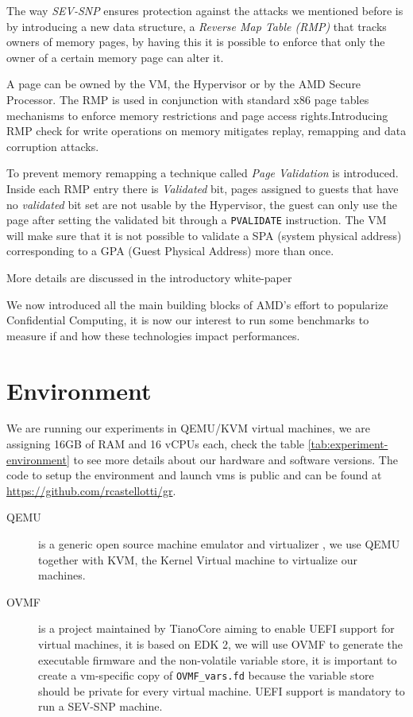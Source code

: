\documentclass[twocolumn]{article}
\begin{document}
The way \textit{SEV-SNP} ensures protection against the attacks we mentioned before is by introducing a new data structure, a \textit{Reverse Map Table (RMP)} that tracks owners of memory pages, by having this it is possible to enforce that only the owner of a certain memory page can alter it.

A page can be owned by the VM, the Hypervisor or by the AMD Secure Processor. The RMP is used in conjunction with standard x86 page tables mechanisms to enforce memory restrictions and page access rights.Introducing RMP check for write operations on memory mitigates replay, remapping and data corruption attacks. 

To prevent memory remapping a technique called \textit{Page Validation} is introduced. Inside each RMP entry there is \textit{Validated} bit, pages assigned to guests that have no \textit{validated} bit set are not usable by the Hypervisor, the guest can only use the page after setting the validated bit through a \texttt{PVALIDATE} instruction. The VM will make sure that it is not possible to validate a SPA (system physical address) corresponding to a GPA (Guest Physical Address) more than once.
 
More details are discussed in the introductory white-paper \cite{sev-snp}

We now introduced all the main building blocks of AMD's effort to popularize Confidential Computing, it is now our interest to run some benchmarks to measure if and how these technologies impact performances.

\section{Environment}
\label{sec:environment}
    
We are running our experiments in QEMU/KVM virtual machines, we are assigning 16GB of RAM and 16 vCPUs each, check the table \ref{tab:experiment-environment} to see more details about our hardware and software versions. The code to setup the environment and launch vms is public and can be found at \href{https://github.com/rcastellotti/gr}{https://github.com/rcastellotti/gr}.

\begin{description}
    \item[QEMU] is a generic open source machine emulator and virtualizer \cite{qemu}, we use QEMU together with KVM, the Kernel Virtual machine to virtualize our machines.
    \item[OVMF] is a project maintained by TianoCore \cite{ovmf} aiming to enable UEFI support for virtual machines, it is based on EDK 2, we will use OVMF to generate the executable firmware and the non-volatile variable store, it is important to create a vm-specific copy of \texttt{OVMF\_vars.fd} because the variable store should be private for every virtual machine. UEFI support is mandatory to run a SEV-SNP machine.
\end{description}
\end{document}
